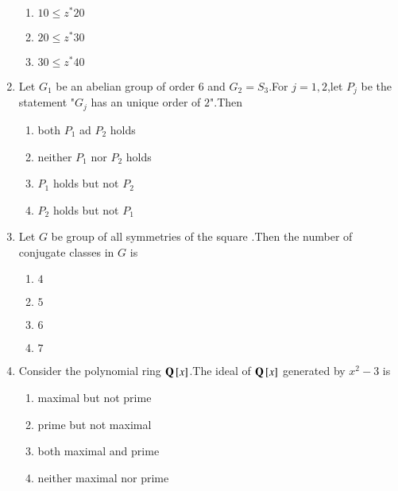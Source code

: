 \documentclass[journal,12pt,onecolumn]{IEEEtran}
\theoremstyle{remark}
\begin{document}
\begin{enumerate}
\begin{enumerate}
       \item $10\leq z^* 20$
        \item $20\leq z^* 30$
         \item $30\leq z^* 40$\\
  \end{enumerate}
  \item Let $G_1$ be an abelian group of order 6 and $G_2 = S_3$.For $j = 1,2$,let $P_j$ be the statement "$G_j$ has an unique order of $2$".Then
  \begin{enumerate}
      \item both $P_1$ ad $P_2$ holds
      \item neither $P_1$ nor $P_2$ holds 
      \item $P_1$ holds but not $P_2$
      \item $P_2$ holds but not $P_1$
  \end{enumerate}
  \item Let $G$ be group of all symmetries of the square .Then the number of conjugate classes in $G$ is 
  \begin{multicols}{4}
      \begin{enumerate}
          \item $4$
          \item $5$
          \item $6$
          \item $7$
      \end{enumerate}
  \end{multicols}
  \item Consider the polynomial ring $\mathbf{Q}{}\left[x\right]$.The ideal of $\mathbf{Q}{}\left[x\right]$ generated by $x^2 -3 $ is
  \begin{enumerate}
      \item maximal but not prime
      \item prime but not maximal
      \item both maximal and prime
      \item neither maximal nor prime
  \end{enumerate}
\end{enumerate}
\end{document}
